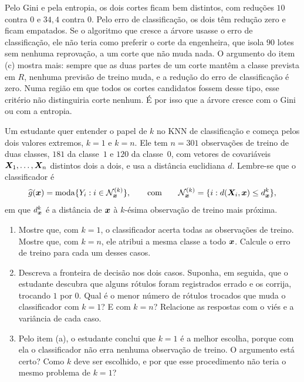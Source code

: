 \documentclass[11pt,a4paper]{article}
\begin{document}
\begin{solucao}
Pelo Gini e pela entropia, os dois cortes ficam bem distintos, com reduções $10$ contra
$0$ e $34{,}4$ contra $0$. Pelo erro de classificação, os dois têm redução zero e ficam
empatados. Se o algoritmo que cresce a árvore usasse o erro de classificação, ele não
teria como preferir o corte da engenheira, que isola $90$ lotes sem nenhuma reprovação,
a um corte que não muda nada. O argumento do item (c) mostra mais: sempre que as duas
partes de um corte mantêm a classe prevista em $R$, nenhuma previsão de treino muda, e a
redução do erro de classificação é zero. Numa região em que todos os cortes candidatos
fossem desse tipo, esse critério não distinguiria corte nenhum. É por isso que a árvore
cresce com o Gini ou com a entropia.
\end{solucao}

\begin{exercicio}
Um estudante quer entender o papel de $k$ no KNN de classificação e começa pelos dois
valores extremos, $k=1$ e $k=n$. Ele tem $n=301$ observações de treino de duas classes,
$181$ da classe~$1$ e $120$ da classe~$0$, com vetores de covariáveis
$\bm{X}_1,\dots,\bm{X}_n$ distintos dois a dois, e usa a distância euclidiana $d$. Lembre-se que o
classificador é
\[
  \widehat{g}(\bm{x})=\operatorname{moda}\{Y_i:i\in\mathcal{N}_{\bm{x}}^{(k)}\},
  \qquad\text{com}\qquad
  \mathcal{N}_{\bm{x}}^{(k)}=\{i:d(\bm{X}_i,\bm{x})\le d^k_{\bm{x}}\},
\]
em que $d^k_{\bm{x}}$ é a distância de $\bm{x}$ à $k$-ésima observação de treino mais próxima.
\begin{enumerate}[label=(\alph*),leftmargin=1.1cm]
  \item Mostre que, com $k=1$, o classificador acerta todas as observações de treino.
        Mostre que, com $k=n$, ele atribui a mesma classe a todo $\bm{x}$. Calcule o erro de treino
        para cada um desses casos.
  \item Descreva a fronteira de decisão nos dois casos. Suponha, em seguida, que o
        estudante descubra que alguns rótulos foram registrados errado e os corrija,
        trocando $1$ por $0$. Qual é o menor número de rótulos trocados que muda o
        classificador com $k=1$? E com $k=n$? Relacione as respostas com o viés e a
        variância de cada caso.
  \item Pelo item (a), o estudante conclui que $k=1$ é a melhor escolha, porque com ela
        o classificador não erra nenhuma observação de treino. O argumento está certo?
        Como $k$ deve ser escolhido, e por que esse procedimento não teria o mesmo problema de $k=1$?
\end{enumerate}
\end{exercicio}
\end{document}
